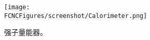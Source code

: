 \begin{figure}[H]
\centering
\texttt{[image: \\FCNCFigures/screenshot/Calorimeter.png]}
\caption{强子量能器。}
\label{fig:Calorimeter}
\end{figure}